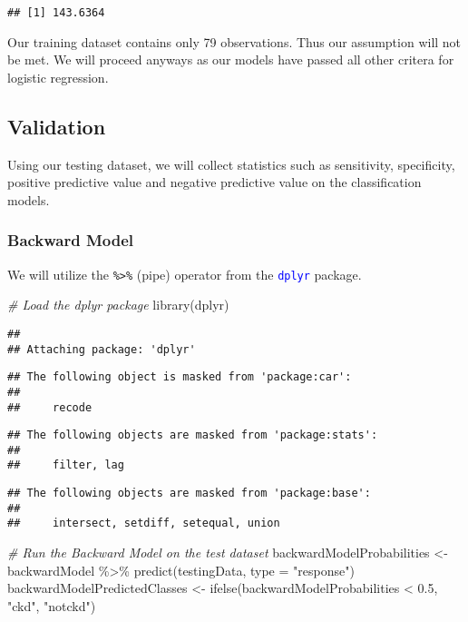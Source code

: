 \documentclass[
]{article}
\newenvironment{Shaded}{\begin{snugshade}}{\end{snugshade}}
\newcommand{\AttributeTok}[1]{\textcolor[rgb]{0.77,0.63,0.00}{#1}}
\newcommand{\CommentTok}[1]{\textcolor[rgb]{0.56,0.35,0.01}{\textit{#1}}}
\newcommand{\FloatTok}[1]{\textcolor[rgb]{0.00,0.00,0.81}{#1}}
\newcommand{\FunctionTok}[1]{\textcolor[rgb]{0.00,0.00,0.00}{#1}}
\newcommand{\NormalTok}[1]{#1}
\newcommand{\OtherTok}[1]{\textcolor[rgb]{0.56,0.35,0.01}{#1}}
\newcommand{\SpecialCharTok}[1]{\textcolor[rgb]{0.00,0.00,0.00}{#1}}
\newcommand{\StringTok}[1]{\textcolor[rgb]{0.31,0.60,0.02}{#1}}
\begin{document}
\begin{verbatim}
## [1] 143.6364
\end{verbatim}

Our training dataset contains only 79 observations. Thus our assumption
will not be met. We will proceed anyways as our models have passed all
other critera for logistic regression.

\hypertarget{validation}{%
\subsection{Validation}\label{validation}}

Using our testing dataset, we will collect statistics such as
sensitivity, specificity, positive predictive value and negative
predictive value on the classification models.

\hypertarget{backward-model}{%
\subsubsection{Backward Model}\label{backward-model}}

We will utilize the \texttt{\%>\%} (pipe) operator from the
\textcolor{blue}{\texttt{dplyr}} package.

\begin{Shaded}
\begin{Highlighting}[]
\CommentTok{\# Load the dplyr package}
\FunctionTok{library}\NormalTok{(dplyr)}
\end{Highlighting}
\end{Shaded}

\begin{verbatim}
## 
## Attaching package: 'dplyr'
\end{verbatim}

\begin{verbatim}
## The following object is masked from 'package:car':
## 
##     recode
\end{verbatim}

\begin{verbatim}
## The following objects are masked from 'package:stats':
## 
##     filter, lag
\end{verbatim}

\begin{verbatim}
## The following objects are masked from 'package:base':
## 
##     intersect, setdiff, setequal, union
\end{verbatim}

\begin{Shaded}
\begin{Highlighting}[]
\CommentTok{\# Run the Backward Model on the test dataset}
\NormalTok{backwardModelProbabilities }\OtherTok{\textless{}{-}}\NormalTok{ backwardModel }\SpecialCharTok{\%\textgreater{}\%} \FunctionTok{predict}\NormalTok{(testingData, }
    \AttributeTok{type =} \StringTok{"response"}\NormalTok{)}
\NormalTok{backwardModelPredictedClasses }\OtherTok{\textless{}{-}} \FunctionTok{ifelse}\NormalTok{(backwardModelProbabilities }\SpecialCharTok{\textless{}} \FloatTok{0.5}\NormalTok{, }
    \StringTok{"ckd"}\NormalTok{, }\StringTok{"notckd"}\NormalTok{)}
\end{Highlighting}
\end{Shaded}
\end{document}
